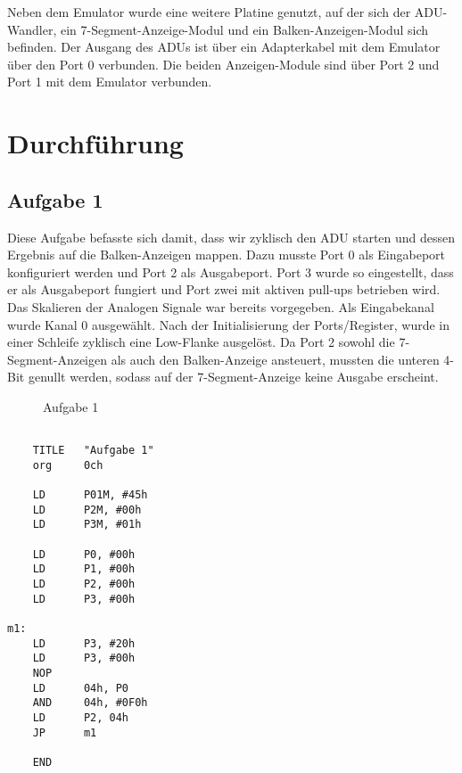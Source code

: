 \documentclass[a4paper,11pt]{article}
\begin{document}
Neben dem Emulator wurde eine weitere Platine genutzt, auf der sich der ADU-Wandler, ein 
7-Segment-Anzeige-Modul und ein Balken-Anzeigen-Modul sich befinden. 
Der Ausgang des ADUs ist über ein Adapterkabel mit dem Emulator über den Port 0 verbunden. 
Die beiden Anzeigen-Module sind über Port 2 und Port 1 mit dem Emulator verbunden. 

\section{Durchführung}

\subsection{Aufgabe 1}
Diese Aufgabe befasste sich damit, dass wir zyklisch den ADU starten und dessen Ergebnis auf die Balken-Anzeigen mappen. 
Dazu musste Port 0 als Eingabeport konfiguriert werden und Port 2 als Ausgabeport. Port 3 wurde so eingestellt, dass er als Ausgabeport fungiert und Port zwei mit aktiven pull-ups betrieben wird. Das Skalieren der Analogen Signale war bereits vorgegeben. 
Als Eingabekanal wurde Kanal 0 ausgewählt.
Nach der Initialisierung der Ports/Register, wurde in einer Schleife zyklisch eine Low-Flanke ausgelöst.
Da Port 2 sowohl die 7-Segment-Anzeigen als auch den Balken-Anzeige ansteuert, mussten die unteren 4-Bit genullt werden, sodass auf der 7-Segment-Anzeige keine Ausgabe erscheint. 

\begin{figure}[p]
\begin{center}

\caption{Aufgabe 1}
\end{center}
\end{figure}

\begin{lstlisting}

	TITLE   "Aufgabe 1"
	org     0ch

	LD      P01M, #45h
	LD      P2M, #00h
	LD      P3M, #01h

	LD      P0, #00h
	LD      P1, #00h
	LD      P2, #00h
	LD      P3, #00h

m1:
	LD      P3, #20h
	LD      P3, #00h
	NOP
	LD      04h, P0
	AND     04h, #0F0h
	LD      P2, 04h
	JP      m1

	END

\end{lstlisting}
\end{document}
